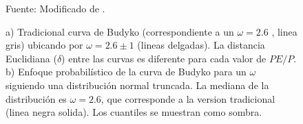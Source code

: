 \vspace{0.5cm}
\begin{figure}[htb!]
\centering
  \hfill
  \hfill
 \caption{a) Tradicional curva de Budyko (correspondiente a un $\omega = 2.6$ \citep{Fu1981,Zhang2004}, linea gris) ubicando por $\omega = 2.6 \pm 1$ (lineas delgadas). La distancia Euclidiana ($\delta$) entre las curvas es diferente para cada valor de $PE/P$. b) Enfoque probabilístico de la curva de Budyko para un $\omega$ siguiendo una distribución normal truncada. La mediana de la distribución es $\omega = 2.6$, que corresponde a la version tradicional (linea negra solida). Los cuantiles se muestran como sombra.}
 Fuente: Modificado de \citet{Greve2015}.
 \label{fig:budyko02}
\end{figure}

